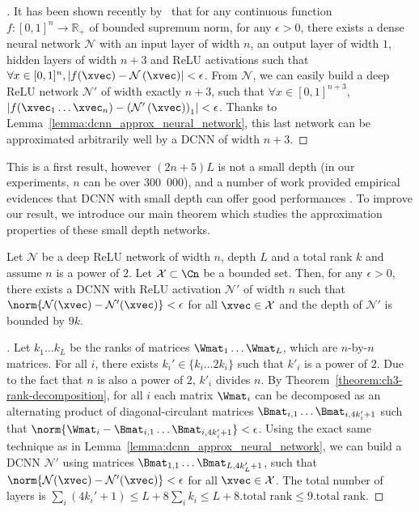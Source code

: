 \begin{proof}[]
It has been shown recently by~\citet{hanin2017universal} that for any continuous function $f:[0,1]^{n} \rightarrow \mathbb{R}_+$ of bounded supremum norm, for any $\epsilon>0$, there exists a dense neural network $\mathcal{N}$ with an input layer of width $n$, an output layer of width $1$, hidden layers of width $n+3$ and ReLU activations such that $\forall x \in [0,1]^n, \left| f(\xvec) - \mathcal{N} \left(\xvec\right)\right| < \epsilon$. From $\mathcal{N}$, we can easily build a deep ReLU network $\mathcal{N'}$ of width exactly $n+3$, such that $\forall x \in [0,1]^{n+3}$, $\left|f(\xvec_{1} \ldots \xvec_{n}) - \left(\mathcal{N}'\left(\xvec\right)\right)_{1}\right| < \epsilon$. Thanks to Lemma~\ref{lemma:dcnn_approx_neural_network}, this last network can be approximated arbitrarily well by a DCNN of width $n+3$.
\end{proof}


This is a first result, however $(2n+5)L$ is not a small depth (in our experiments, $n$ can be over 300~000), and a number of work provided empirical evidences that DCNN with small depth can offer good performances \cite{anca2018eccv,cheng}. To improve our result, we introduce our main theorem which studies the approximation properties of these small depth networks.

\begin{theorem} \label{theorem:ch3-low_rank_nn}
Let $\mathcal{N}$ be a deep ReLU network of width $n$, depth $L$ and a total rank $k$ and assume $n$ is a power of $2$.
Let $\mathcal{X} \subset \Cn$ be a bounded set.
Then, for any $\epsilon > 0$, there exists a DCNN with ReLU activation $\mathcal{N}'$ of width $n$ such that $\norm{ \mathcal{N}(\xvec) - \mathcal{N}'(\xvec)} < \epsilon$ for all $\xvec \in \mathcal{X}$ and the depth of $\mathcal{N}'$ is bounded by $9k$.
\end{theorem}

\begin{proof}[]
Let $k_{1} \ldots k_{L}$ be the ranks of matrices $\Wmat_{1} \ldots \Wmat_{L}$, which are $n$-by-$n$ matrices.
For all $i$, there exists $k_{i}' \in \{k_{i} \ldots 2k_{i}\}$ such that $k'_{i}$ is a power of $2$.
Due to the fact that $n$ is also a power of $2$, $k'_{i}$ divides $n$.
By Theorem~\ref{theorem:ch3-rank-decomposition}, for all $i$ each matrix $\Wmat_{i}$ can be decomposed as an alternating product of diagonal-circulant matrices $\Bmat_{i,1} \ldots \Bmat_{i,4k'_{i}+1}$ such that $\norm{ \Wmat_{i} - \Bmat_{i,1} \ldots \Bmat_{i,4k'_{i}+1}} < \epsilon$.
Using the exact same technique as in Lemma~\ref{lemma:dcnn_approx_neural_network}, we can build a DCNN $\mathcal{N}'$ using matrices $\Bmat_{1,1} \ldots \Bmat_{L,4k'_{L}+1}$, such that $\norm{ \mathcal{N}(\xvec) - \mathcal{N}'(\xvec)} < \epsilon$ for all $\xvec \in \mathcal{X}$.
The total number of layers is $\sum_{i}\left(4k_{i}'+1\right)\le L+8\sum_{i}k_{i}\le L+8.
\textrm{total rank} \le 9.\textrm{total rank}$.
\end{proof}

